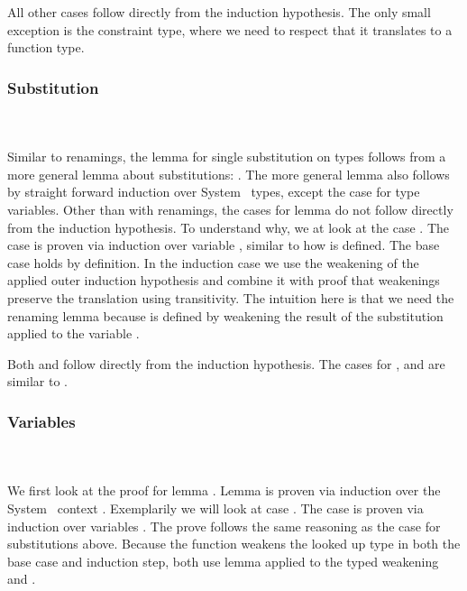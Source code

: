\noindent All other cases follow directly from the induction hypothesis. 
The only small exception is the constraint type, where we need to respect that it translates to a function type.

\subsubsection{Substitution}\hfill\\\\
Similar to renamings, the lemma for single substitution on types  follows from a more general lemma about substitutions: \DPTTypePresSingleSub. 
The more general lemma  also follows by straight forward induction over System \Fo\ types, except the case for type variables. 
Other than with renamings, the cases for lemma  do not follow directly from the induction hypothesis. 
To understand why, we at look at the case .
\DPTVarPresSub
The case  is proven via induction over variable , similar to how  is defined. 
The base case holds by definition. 
In the induction case we use the weakening of the applied outer induction hypothesis and combine it with proof that weakenings preserve the translation using transitivity. 
The intuition here is that we need the renaming lemma  because  is defined by weakening the result of the substitution  applied to the variable .

\noindent Both  and  follow directly from the induction hypothesis. 
The cases for ,  and  are similar to .

\subsubsection{Variables}\hfill\\\\
We first look at the proof for lemma . 
Lemma  is proven via induction over the System \Fo\ context . 
\DPTVarPresLookup
Exemplarily we will look at case   . The case is proven via induction over variables . 
The prove follows the same reasoning as the  case for substitutions above. 
Because the function  weakens the looked up type  in both the base case and induction step, both use lemma  applied to the typed weakening and . 

